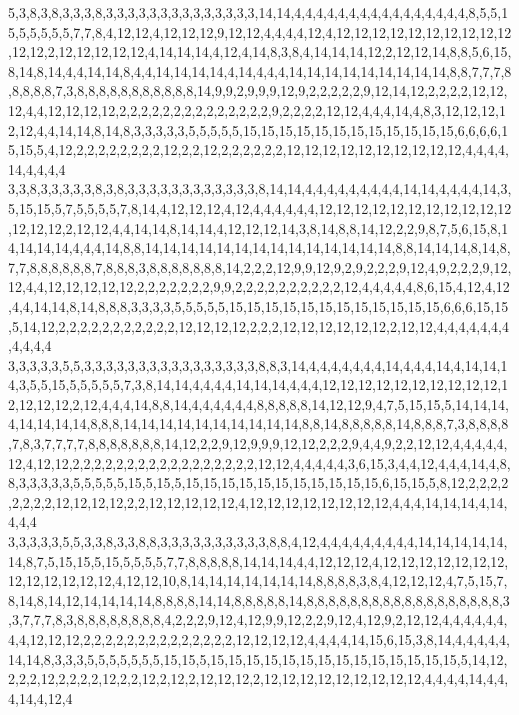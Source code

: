 5,3,8,3,8,3,3,3,8,3,3,3,3,3,3,3,3,3,3,3,3,3,3,14,14,4,4,4,4,4,4,4,4,4,4,4,4,4,4,4,4,8,5,5,15,5,5,5,5,5,7,7,8,4,12,12,4,12,12,12,9,12,12,4,4,4,4,12,4,12,12,12,12,12,12,12,12,12,12,12,12,2,12,12,12,12,12,4,14,14,14,4,12,4,14,8,3,8,4,14,14,14,12,2,12,12,14,8,8,5,6,15,8,14,8,14,4,4,14,14,8,4,4,14,14,14,14,4,14,4,4,4,14,14,14,14,14,14,14,14,14,8,8,7,7,7,8,8,8,8,8,7,3,8,8,8,8,8,8,8,8,8,8,8,14,9,9,2,9,9,9,12,9,2,2,2,2,2,9,12,14,12,2,2,2,2,12,12,12,4,4,12,12,12,12,2,2,2,2,2,2,2,2,2,2,2,2,2,2,9,2,2,2,2,12,12,4,4,4,14,4,8,3,12,12,12,12,12,4,4,14,14,8,14,8,3,3,3,3,3,5,5,5,5,5,15,15,15,15,15,15,15,15,15,15,15,15,6,6,6,6,15,15,5,4,12,2,2,2,2,2,2,2,2,12,2,2,12,2,2,2,2,2,2,12,12,12,12,12,12,12,12,12,12,4,4,4,4,14,4,4,4,4
3,3,8,3,3,3,3,3,8,3,8,3,3,3,3,3,3,3,3,3,3,3,3,8,14,14,4,4,4,4,4,4,4,4,4,14,14,4,4,4,4,14,3,5,15,15,5,7,5,5,5,5,7,8,14,4,12,12,12,4,12,4,4,4,4,4,4,12,12,12,12,12,12,12,12,12,12,12,12,12,12,2,12,12,4,4,14,14,8,14,14,4,12,12,12,14,3,8,14,8,8,14,12,2,2,9,8,7,5,6,15,8,14,14,14,14,4,4,4,14,8,8,14,14,14,14,14,14,14,14,14,14,14,14,14,14,8,8,14,14,14,8,14,8,7,7,8,8,8,8,8,8,7,8,8,8,3,8,8,8,8,8,8,8,14,2,2,2,12,9,9,12,9,2,9,2,2,2,9,12,4,9,2,2,2,9,12,12,4,4,12,12,12,12,12,2,2,2,2,2,2,2,9,9,2,2,2,2,2,2,2,2,2,2,12,4,4,4,4,4,8,6,15,4,12,4,12,4,4,14,14,8,14,8,8,8,3,3,3,3,5,5,5,5,5,15,15,15,15,15,15,15,15,15,15,15,15,6,6,6,15,15,5,14,12,2,2,2,2,2,2,2,2,2,2,2,12,12,12,12,2,2,2,12,12,12,12,12,12,2,12,12,4,4,4,4,4,4,4,4,4,4,4
3,3,3,3,3,5,5,3,3,3,3,3,3,3,3,3,3,3,3,3,3,3,3,8,8,3,14,4,4,4,4,4,4,4,14,4,4,4,14,4,14,14,14,3,5,5,15,5,5,5,5,5,7,3,8,14,14,4,4,4,4,14,14,14,4,4,4,12,12,12,12,12,12,12,12,12,12,12,12,12,12,2,12,4,4,4,14,8,8,14,4,4,4,4,4,4,8,8,8,8,8,14,12,12,9,4,7,5,15,15,5,14,14,14,4,14,14,14,14,8,8,8,14,14,14,14,14,14,14,14,14,14,8,8,14,8,8,8,8,8,14,8,8,8,7,3,8,8,8,8,7,8,3,7,7,7,7,8,8,8,8,8,8,8,14,12,2,2,9,12,9,9,9,12,12,2,2,2,9,4,4,9,2,2,12,12,4,4,4,4,4,12,4,12,12,2,2,2,2,2,2,2,2,2,2,2,2,2,2,2,2,2,12,12,4,4,4,4,4,3,6,15,3,4,4,12,4,4,4,14,4,8,8,3,3,3,3,3,5,5,5,5,5,15,5,15,5,15,15,15,15,15,15,15,15,15,15,15,6,15,15,5,8,12,2,2,2,2,2,2,2,2,12,12,12,12,2,2,12,12,12,12,12,4,12,12,12,12,12,12,12,12,4,4,4,14,14,14,4,14,4,4,4
3,3,3,3,3,5,5,3,3,8,3,3,8,8,3,3,3,3,3,3,3,3,3,3,8,8,4,12,4,4,4,4,4,4,4,4,4,14,14,14,14,14,14,8,7,5,15,15,5,15,5,5,5,5,7,7,8,8,8,8,8,14,14,14,4,4,12,12,12,4,12,12,12,12,12,12,12,12,12,12,12,12,12,4,12,12,10,8,14,14,14,14,14,14,14,8,8,8,8,3,8,4,12,12,12,4,7,5,15,7,8,14,8,14,12,14,14,14,14,8,8,8,8,14,14,8,8,8,8,8,14,8,8,8,8,8,8,8,8,8,8,8,8,8,8,8,8,8,8,3,3,7,7,7,8,3,8,8,8,8,8,8,8,8,4,2,2,2,9,12,4,12,9,9,12,2,2,9,12,4,12,9,2,12,12,4,4,4,4,4,4,4,4,12,12,12,2,2,2,2,2,2,2,2,2,2,2,2,2,2,12,12,12,12,4,4,4,4,14,15,6,15,3,8,14,4,4,4,4,4,14,14,8,3,3,3,5,5,5,5,5,5,5,15,15,5,15,15,15,15,15,15,15,15,15,15,15,15,15,15,5,14,12,2,2,2,12,2,2,2,2,12,2,2,12,2,12,2,12,12,12,2,12,12,12,12,12,12,12,12,12,4,4,4,4,14,4,4,4,14,4,12,4
